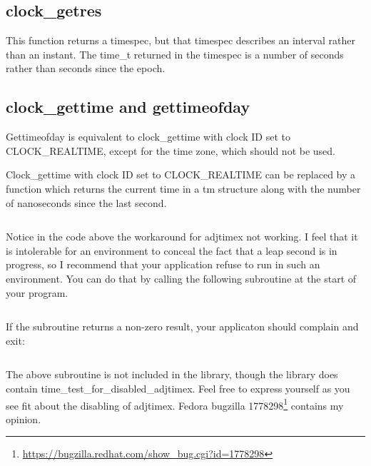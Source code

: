 \documentclass[letterpaper,twoside]{article}
\begin{document}
\subsection{clock\_getres}
This function returns a timespec, but that timespec describes an interval
rather than an instant.  The {\ttfamily time\_t} returned in the timespec is a
number of seconds rather than seconds since the epoch.

\subsection{clock\_gettime and gettimeofday}
Gettimeofday is equivalent to clock\_gettime with clock ID set to
CLOCK\_REAL\-TIME, except for the time zone, which should not be used.

Clock\_gettime with clock ID set to CLOCK\_REAL\-TIME can be replaced by
a function which returns the current time in a {\ttfamily tm} structure along
with the number of nanoseconds since the last second.
\inputminted[firstline=34]{c}{src/time_current_tm_nano.c}

Notice in the code above the workaround for {\ttfamily adjtimex}
not working.  I feel that it is intolerable for an environment to
conceal the fact that a leap second is in progress, so I recommend
that your application refuse to run in such an environment.  You
can do that by calling the following subroutine at the start
of your program.
\inputminted[firstline=36]{c}{src/time_test_for_disabled_adjtimex.c}
If the subroutine returns a non-zero result, your applicaton should
complain and exit:
\inputminted[firstline=47,lastline=67]{c}{tests/test_for_disabled_adjtimex.c}
The above subroutine is not included in the library, though
the library does contain
{\ttfamily time\_test\_for\_disabled\_adjtimex}.
Feel free to express yourself as you see fit about the disabling
of {\ttfamily adjtimex}.  Fedora bugzilla
\num{1778298}\footnote{\href{https://bugzilla.redhat.com/show_bug.cgi?id=1778298}{https://bugzilla.redhat.com/show\_bug.cgi?id=1778298}}
contains my opinion.
\end{document}

